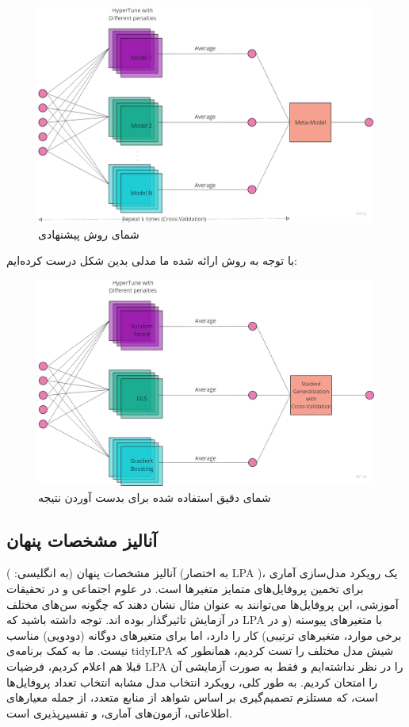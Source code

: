 \documentclass[12pt,a4paper,BCOR=.7cm,headsepline,bibliography=totoc]{report}
\begin{document}
\begin{figure}[H]
\centering
\includegraphics[width=12cm, ]{pictures/ourapproach_general.jpg}
\caption{
شمای روش پیشنهادی
}\label{wrap-fig:4}
\end{figure}
با توجه به روش ارائه شده ما مدلی بدین شکل درست کرده‌ایم:
\begin{figure}[H]
\centering
\includegraphics[width=12cm, ]{pictures/ourapproach.jpg}
\caption{
شمای دقیق استفاده شده برای بدست آوردن نتیجه
}\label{wrap-fig:4}
\end{figure}
\subsection{آنالیز مشخصات پنهان}
آنالیز مشخصات پنهان (به انگلیسی: ) (به اختصار LPA )، یک رویکرد مدل‌سازی آماری برای تخمین پروفایل‌های متمایز متغیرها است. در علوم اجتماعی و در تحقیقات آموزشی، این پروفایل‌ها می‌توانند به عنوان مثال نشان دهند که چگونه سن‌های مختلف در آزمایش تاثیرگذار بوده اند. توجه داشته باشید که LPA با متغیرهای پیوسته (و در برخی موارد، متغیرهای ترتیبی) کار را دارد، اما برای متغیرهای دوگانه (دودویی) مناسب نیست. ما به کمک برنامه‌ی  tidyLPA شیش مدل مختلف را تست کردیم، همانطور که قبلا هم اعلام کردیم، فرضیات LPA را در نظر نداشته‌ایم و فقط به صورت آزمایشی آن را امتحان کردیم. به طور کلی، رویکرد انتخاب مدل مشابه انتخاب تعداد پروفایل‌ها است، که مستلزم تصمیم‌گیری بر اساس شواهد از منابع متعدد، از جمله معیارهای اطلاعاتی، آزمون‌های آماری، و تفسیرپذیری است.\\
\end{document}
